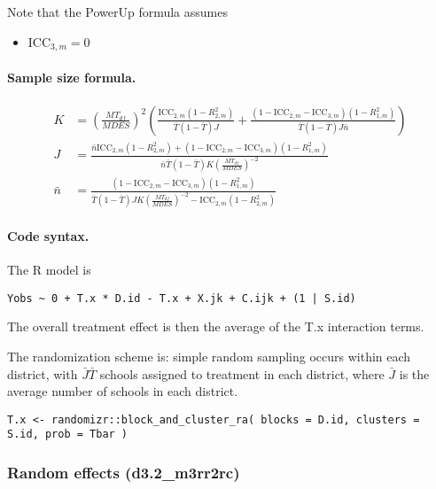 \documentclass[12pt]{article}
\begin{document}
Note that the PowerUp formula assumes
\begin{itemize}
\item $\text{ICC}_{3,m} = 0$
\end{itemize}

\paragraph{Sample size formula.} 
\begin{align}
K &= \left(\frac{MT_{df}}{MDES}\right)^2 \left( \frac{\text{ICC}_{2,m} (1-R_{2,m}^2)}{\bar{T}(1 - \bar{T}) J} + \frac{(1-\text{ICC}_{2,m} - \text{ICC}_{3,m})(1-R^2_{1,m})}{\bar{T}(1 - \bar{T}) J \bar{n}} \right)\\
J &= \frac{\bar{n}\text{ICC}_{2,m} (1-R_{2,m}^2) + (1-\text{ICC}_{2,m} - \text{ICC}_{3,m})(1-R^2_{1,m})}{\bar{n} \bar{T}(1 - \bar{T}) K \left(\frac{MT_{df}}{MDES}\right)^{-2} } \\
\bar{n} &= \frac{(1-\text{ICC}_{2,m} - \text{ICC}_{3,m})(1-R^2_{1,m})}{\bar{T}(1 - \bar{T})J K \left(\frac{MT_{df}}{MDES}\right)^{-2} -  \text{ICC}_{2,m} (1-R_{2,m}^2)}
\end{align}


\paragraph{Code syntax.}
The R model is
\begin{verbatim}
Yobs ~ 0 + T.x * D.id - T.x + X.jk + C.ijk + (1 | S.id)
\end{verbatim}
The overall treatment effect is then the average of the T.x interaction terms.

The randomization scheme is: simple random sampling occurs within each district, with $\bar{J} \bar{T}$ schools assigned to treatment in each district, where $\bar{J}$ is the average number of schools in each district.
\begin{verbatim}
T.x <- randomizr::block_and_cluster_ra( blocks = D.id, clusters = S.id, prob = Tbar )
\end{verbatim}

\newpage
\subsubsection{Random effects (d3.2\_m3rr2rc)}
\end{document}

